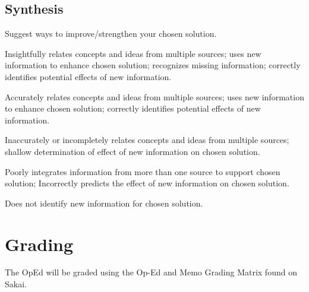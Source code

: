 \documentclass{tufte-handout}\usepackage[]{graphicx}\usepackage[]{color}
\newenvironment{enumerate*}%
  {\begin{enumerate}%
    \setlength{\itemsep}{0pt}%
    \setlength{\parskip}{0pt}}%
  {\end{enumerate}}
\begin{document}
\subsection{Synthesis}

Suggest ways to improve/strengthen your chosen solution.

\begin{enumerate*}
	\item Insightfully relates concepts and ideas from multiple sources; uses new information to enhance chosen solution; recognizes missing information; correctly identifies potential effects of new information.	
	\item Accurately relates concepts and ideas from multiple sources; uses new information to enhance chosen solution; correctly identifies potential effects of new information.	
	\item Inaccurately or incompletely relates concepts and ideas from multiple sources; shallow determination of effect of new information on chosen solution.	
	\item Poorly integrates information from more than one source to support chosen solution; Incorrectly predicts the effect of new information on chosen solution.	
	\item Does not identify new information for chosen solution.	
\end{enumerate*}

\section{Grading}

The OpEd will be graded using the Op-Ed and Memo Grading Matrix found on Sakai.
\end{document}
